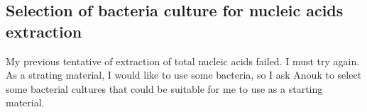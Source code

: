 \subsection{Selection of bacteria culture for nucleic acids extraction}
\label{task:20180111_cj3}

My previous tentative of extraction of total nucleic acids failed. I must try again. As a strating material, I would like to use some bacteria, so I ask Anouk to select some bacterial cultures that could be suitable for me to use as a starting material.